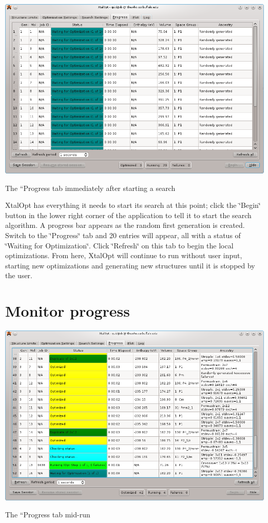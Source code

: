 \begin{DoxyImage}
\includegraphics[width=\textwidth]{prog-start.png}
\caption{The ``\+Progress\textquotesingle{}\textquotesingle{} tab immediately after starting a search}
\end{DoxyImage}


Xtal\+Opt has everything it needs to start its search at this point; click the \char`\"{}\+Begin\char`\"{} button in the lower right corner of the application to tell it to start the search algorithm. A progress bar appears as the random first generation is created. Switch to the \char`\"{}\+Progress\char`\"{} tab and 20 entries will appear, all with a status of \char`\"{}\+Waiting for
\+Optimization\char`\"{}. Click \char`\"{}\+Refresh\char`\"{} on this tab to begin the local optimizations. From here, Xtal\+Opt will continue to run without user input, starting new optimizations and generating new structures until it is stopped by the user.\hypertarget{tut-xo_prog-mon}{}\section{Monitor progress}\label{tut-xo_prog-mon}

\begin{DoxyImage}
\includegraphics[width=\textwidth]{prog-mon.png}
\caption{The ``\+Progress\textquotesingle{}\textquotesingle{} tab mid-\/run}
\end{DoxyImage}


